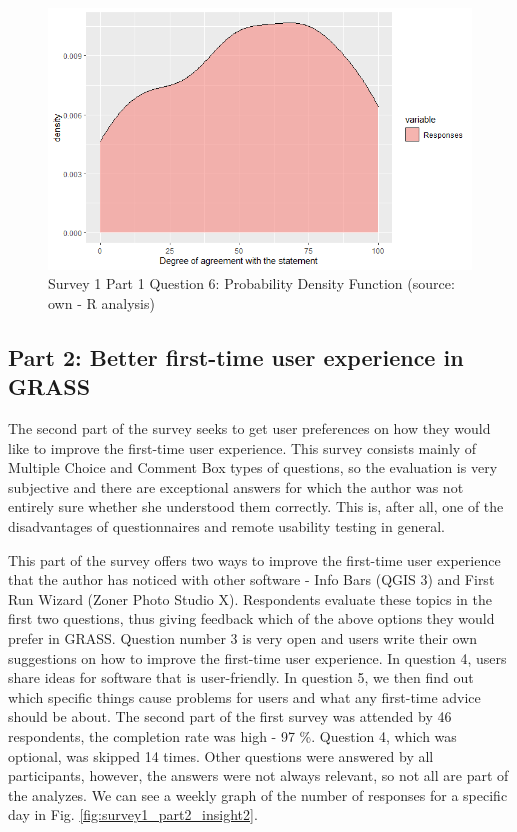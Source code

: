 \documentclass[a4paper,10pt,twoside]{article}
\begin{document}
\vspace{0.3cm}
\begin{figure}[hbt!] 
\begin{center}
\includegraphics[width=15cm]{../surveys/analyzed_data/survey1_part1_question6_r_pdf.png} 
\caption[Survey 1 Part 1 Question 6: Probability Density Function]{Survey 1 Part 1 Question 6: Probability Density Function (source: own - R analysis)}
\label{fig:survey1_part1_question6_r_pdf}
\end{center}
\end{figure}


\newpage
\vspace*{-1cm}
\subsection{Part 2: Better first-time user experience in GRASS}

\noindent The second part of the survey seeks to get user preferences on how they would like to improve the first-time user experience. This survey consists mainly of Multiple Choice and Comment Box types of questions, so the evaluation is very subjective and there are exceptional answers for which the author was not entirely sure whether she understood them correctly. This is, after all, one of the disadvantages of questionnaires and remote usability testing in general.

This part of the survey offers two ways to improve the first-time user experience that the author has noticed with other software - Info Bars (QGIS 3) and First Run Wizard (Zoner Photo Studio X). Respondents evaluate these topics in the first two questions, thus giving feedback which of the above options they would prefer in GRASS. Question number 3 is very open and users write their own suggestions on how to improve the first-time user experience. In question 4, users share ideas for software that is user-friendly. In question 5, we then find out which specific things cause problems for users and what any first-time advice should be about. The second part of the first survey was attended by 46 respondents, the completion rate was high - 97 \%. Question 4, which was optional, was skipped 14 times. Other questions were answered by all participants, however, the answers were not always relevant, so not all are part of the analyzes. We can see a weekly graph of the number of responses for a specific day in Fig. \ref{fig:survey1_part2_insight2}.
\end{document}

